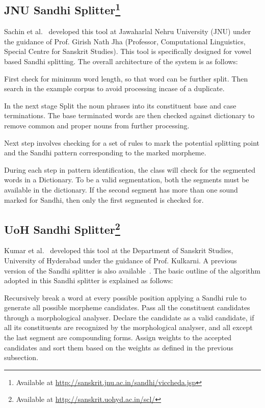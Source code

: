 \documentclass[11pt]{article}
\begin{document}
\subsection{JNU Sandhi Splitter\footnote{Available at \url{http://sanskrit.jnu.ac.in/sandhi/viccheda.jsp}}} Sachin et al.~\cite{sachin2007sandhi} developed this tool at Jawaharlal Nehru University (JNU) under the guidance of Prof. Girish Nath Jha (Professor, Computational Linguistics, Special Centre for Sanskrit Studies). This tool is specifically designed for vowel based Sandhi splitting. The overall architecture of the system is as follows:


	First check for minimum word length, so that word can be further split. Then search in the example corpus to avoid processing incase of a duplicate.
	
	In the next stage Split the noun phrases into its constituent base and case terminations. The base terminated words are then checked against dictionary to remove common and proper nouns from further processing.
	
	Next step involves checking for a set of rules to mark the potential splitting point and the Sandhi pattern corresponding to the marked morpheme.
	
	During  each  step  in pattern  identification, the class will check for the  segmented words in a Dictionary. To be a valid segmentation, both the segments must be available in the dictionary. If the second segment has more than one sound marked for Sandhi, then only the first segmented is checked for.


\subsection{UoH Sandhi Splitter\footnote{Available at \url{http://sanskrit.uohyd.ac.in/scl/} }}
Kumar et al.~\cite{Kumar2010amb} developed this tool at the Department of Sanskrit Studies, University of Hyderabad under the guidance of Prof. Kulkarni. 
A previous version of the Sandhi splitter is also available~\cite{ss}. The basic outline of the algorithm adopted in this Sandhi splitter is explained as follows:

 Recursively break a word at every possible position applying a Sandhi rule to generate all possible morpheme candidates.
Pass all the constituent candidates through a morphological analyser.
 Declare the candidate as a valid candidate, if all its constituents are recognized by the morphological analyser, and all except the last segment are compounding forms.
Assign weights to the accepted candidates and sort them based on the weights as defined in the previous subsection.
\end{document}
